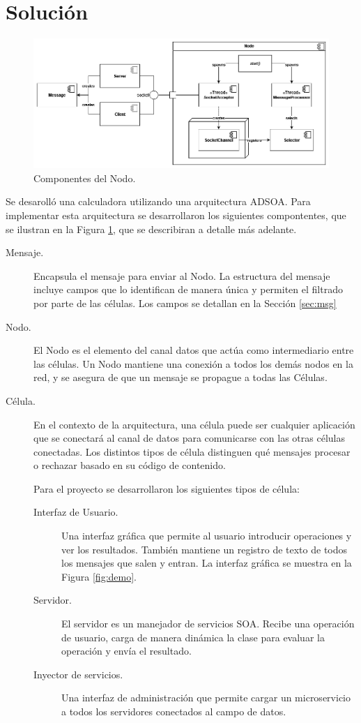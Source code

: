 \documentclass[conference,compsoc]{IEEEtran}
\begin{document}
\section{Solución}

\begin{figure}[hbt]
    \centering
    \includegraphics[width=\columnwidth]{node_components.png}
    \caption{Componentes del Nodo.}
    \label{fig:components}
\end{figure}

Se desarolló una calculadora utilizando una arquitectura ADSOA. Para implementar esta arquitectura se desarrollaron los siguientes compontentes, que se ilustran en la Figura \ref{fig:components}, que se describiran a detalle más adelante.

\begin{description}
    \item[Mensaje.] Encapsula el mensaje para enviar al Nodo. La estructura del mensaje incluye campos que lo identifican de manera única y permiten el filtrado por parte de las células. Los campos se detallan en la Sección \ref{sec:msg}
    \item[Nodo.] El Nodo es el elemento del canal datos que actúa como intermediario entre las células. Un Nodo mantiene una conexión a todos los demás nodos en la red, y se asegura de que un mensaje se propague a todas las Células.
    \item[Célula.] En el contexto de la arquitectura, una célula puede ser cualquier aplicación que se conectará al canal de datos para comunicarse con las otras células conectadas. Los distintos tipos de célula distinguen qué mensajes procesar o rechazar basado en su código de contenido.
    
    Para el proyecto se desarrollaron los siguientes tipos de célula:
    \begin{description}
        \item[Interfaz de Usuario.] Una interfaz gráfica que permite al usuario introducir operaciones y ver los resultados. También mantiene un registro de texto de todos los mensajes que salen y entran. La interfaz gráfica se muestra en la Figura \ref{fig:demo}.
        \item[Servidor.] El servidor es un manejador de servicios SOA. Recibe una operación de usuario, carga de manera dinámica la clase para evaluar la operación y envía el resultado.
        \item[Inyector de servicios.] Una interfaz de administración que permite cargar un microservicio a todos los servidores conectados al campo de datos.
    \end{description}
\end{description}
\end{document}
